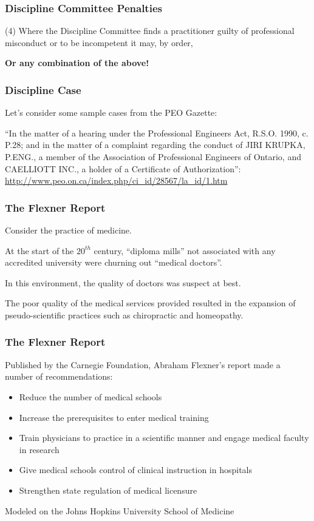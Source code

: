 \begin{frame}
\frametitle{Discipline Committee Penalties}

(4) Where the Discipline Committee finds a practitioner guilty of professional misconduct or to be incompetent it may, by order,


\textbf{Or any combination of the above!}


\end{frame}



\begin{frame}
\frametitle{Discipline Case}

Let's consider some sample cases from the PEO Gazette:



``In the matter of a hearing under the Professional Engineers Act, R.S.O. 1990, c. P.28; and in the matter of a complaint regarding the conduct of JIRI KRUPKA, P.ENG., a member of the Association of Professional Engineers of Ontario, and CAELLIOTT INC., a holder of a Certificate of Authorization'':\\
\url{ http://www.peo.on.ca/index.php/ci_id/28567/la_id/1.htm }



\end{frame}


\begin{frame}
\frametitle{The Flexner Report}

Consider the practice of medicine.

At the start of the $20^{th}$ century, ``diploma mills'' not associated with any accredited university were churning out ``medical doctors''.

In this environment, the quality of doctors was suspect at best.

The poor quality of the medical services provided resulted in the expansion of pseudo-scientific practices such as chiropractic and homeopathy.

\end{frame}



\begin{frame}
\frametitle{The Flexner Report}

Published by the Carnegie Foundation, Abraham Flexner's report made a number of recommendations:

\begin{itemize}
	\item Reduce the number of medical schools
	\item Increase the prerequisites to enter medical training
	\item Train physicians to practice in a scientific manner and engage medical faculty in research
	\item Give medical schools control of clinical instruction in hospitals
	\item Strengthen state regulation of medical licensure
\end{itemize}

Modeled on the Johns Hopkins University School of Medicine

\end{frame}



